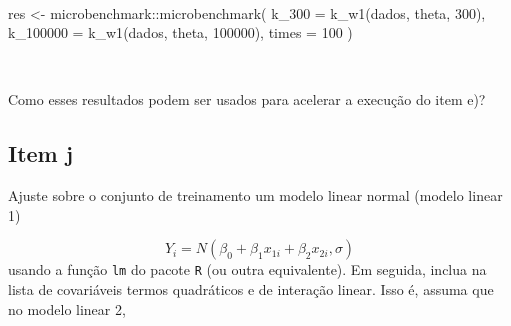 \documentclass[
  a4paperpaper,
]{article}
\newenvironment{Shaded}{\begin{snugshade}}{\end{snugshade}}
\newcommand{\AttributeTok}[1]{\textcolor[rgb]{0.40,0.45,0.13}{#1}}
\newcommand{\DecValTok}[1]{\textcolor[rgb]{0.68,0.00,0.00}{#1}}
\newcommand{\FunctionTok}[1]{\textcolor[rgb]{0.28,0.35,0.67}{#1}}
\newcommand{\NormalTok}[1]{\textcolor[rgb]{0.00,0.23,0.31}{#1}}
\newcommand{\OtherTok}[1]{\textcolor[rgb]{0.00,0.23,0.31}{#1}}
\newcommand{\SpecialCharTok}[1]{\textcolor[rgb]{0.37,0.37,0.37}{#1}}
\begin{document}
\begin{figure}[H]


\caption{\label{fig-gradientek}}

\end{figure}%

~

\begin{Shaded}
\begin{Highlighting}[]
\NormalTok{res }\OtherTok{\textless{}{-}}\NormalTok{ microbenchmark}\SpecialCharTok{::}\FunctionTok{microbenchmark}\NormalTok{(}
  \AttributeTok{k\_300 =} \FunctionTok{k\_w1}\NormalTok{(dados, theta, }\DecValTok{300}\NormalTok{),}
  \AttributeTok{k\_100000 =} \FunctionTok{k\_w1}\NormalTok{(dados, theta, }\DecValTok{100000}\NormalTok{),}
  \AttributeTok{times =} \DecValTok{100}
\NormalTok{) }
\end{Highlighting}
\end{Shaded}

~

Como esses resultados podem ser usados para acelerar a execução do item
e)?

\subsection{Item j}\label{item-j}

Ajuste sobre o conjunto de treinamento um modelo linear normal (modelo
linear 1)

\[
Y_i = N \left(\beta_0 + \beta_1 x_{1i} + \beta_2 x_{2i}, \sigma \right)
\] usando a função \texttt{lm} do pacote \texttt{R} (ou outra
equivalente). Em seguida, inclua na lista de covariáveis termos
quadráticos e de interação linear. Isso é, assuma que no modelo linear
2,
\end{document}
